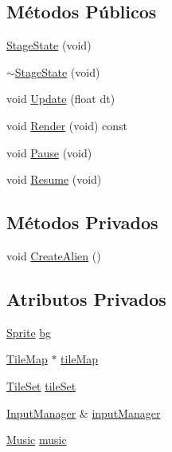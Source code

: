 \subsection*{Métodos Públicos}
\begin{DoxyCompactItemize}
\item 
\hyperlink{classStageState_a83447a9a485bd3cf9f2c0d293343ec42}{Stage\+State} (void)
\item 
\hyperlink{classStageState_aaf42c9072c4d2503c8566135ef2a10da}{$\sim$\+Stage\+State} (void)
\item 
void \hyperlink{classStageState_ae77d7d804ee36c434faf52ace163e85a}{Update} (float dt)
\item 
void \hyperlink{classStageState_a6539a58d85b9367d6c027c3348f1b538}{Render} (void) const 
\item 
void \hyperlink{classStageState_a7551ce8a236840e075f6f38f44140e59}{Pause} (void)
\item 
void \hyperlink{classStageState_a1ca42c08929c560284b04a08362e0c8c}{Resume} (void)
\end{DoxyCompactItemize}
\subsection*{Métodos Privados}
\begin{DoxyCompactItemize}
\item 
void \hyperlink{classStageState_a4d8a6aaeb5c87f9cd829ad10825ce06f}{Create\+Alien} ()
\end{DoxyCompactItemize}
\subsection*{Atributos Privados}
\begin{DoxyCompactItemize}
\item 
\hyperlink{classSprite}{Sprite} \hyperlink{classStageState_aa52c55dee219d1bbd1690e8c3c8e34f6}{bg}
\item 
\hyperlink{classTileMap}{Tile\+Map} $\ast$ \hyperlink{classStageState_a1c795e4b3e5c0522709a6060e52291e4}{tile\+Map}
\item 
\hyperlink{classTileSet}{Tile\+Set} \hyperlink{classStageState_ac1ef17645d0585767eaf96693a88d9bb}{tile\+Set}
\item 
\hyperlink{classInputManager}{Input\+Manager} \& \hyperlink{classStageState_acbf7ba483ee1ae6fe7d20f22b5c721b3}{input\+Manager}
\item 
\hyperlink{classMusic}{Music} \hyperlink{classStageState_a60c8325a1df466aff9f24ea167178350}{music}
\end{DoxyCompactItemize}

